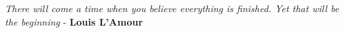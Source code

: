 \textit{There will come a time when you believe everything is finished. Yet that will be the beginning }- \textbf{Louis L'Amour}
